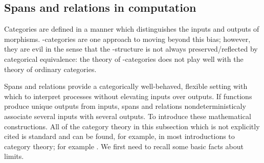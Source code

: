 
\subsection{Spans and relations in computation}

Categories are defined in a manner which distinguishes the inputs and outputs of morphisms.  \dag-categories are one approach to moving beyond this bias; however, they are evil in the sense that the \dag-structure is not always preserved/reflected by categorical equivalence: the theory of \dag-categories does not play well with the theory of ordinary categories.  

Spans and relations provide a categorically well-behaved, flexible setting with which to interpret processes without elevating inputs over outputs.
If functions produce unique outputs from inputs, spans and relations nondeterministicaly associate several inputs with several outputs.  To introduce these mathematical constructions.
All of the category theory in this subsection which is not explicitly cited is standard and can be found, for example, in most introductions to category theory; for example \cite{maclane}.
We first need to recall some basic facts about limits.



